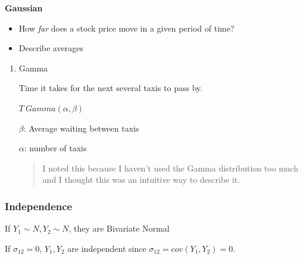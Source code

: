 \documentclass[11pt]{article}
\begin{document}
\textbf{Gaussian}
\begin{itemize}
\item How \emph{far} does a stock price move in a given period of time?
\item Describe averages
\end{itemize}

\begin{enumerate}
\item Gamma
\label{sec:org9c310d5}

Time it takes for the next several taxis to pass by.

\(T ~ Gamma(\alpha, \beta)\)

\(\beta\): Average waiting between taxis

\(\alpha\): number of taxis

\begin{quote}
I noted this because I haven't used the Gamma distribution too much and I
thought this was an intuitive way to describe it.
\end{quote}
\end{enumerate}

\subsubsection{Independence}
\label{sec:orgf0b4437}

If \(Y_1 \sim N, Y_2 \sim N\), they are Bivariate Normal

If \(\sigma_{12} = 0\), \(Y_1, Y_2\) are independent since \(\sigma_{12} = cov(Y_1,
Y_2) = 0\).
\end{document}
